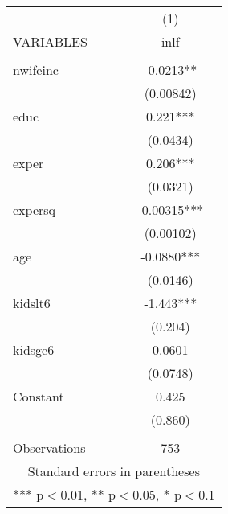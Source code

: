 \documentclass[]{article}
\begin{document}
\begin{tabular}{lc} \hline
 & (1) \\
VARIABLES & inlf \\ \hline
 &  \\
nwifeinc & -0.0213** \\
 & (0.00842) \\
educ & 0.221*** \\
 & (0.0434) \\
exper & 0.206*** \\
 & (0.0321) \\
expersq & -0.00315*** \\
 & (0.00102) \\
age & -0.0880*** \\
 & (0.0146) \\
kidslt6 & -1.443*** \\
 & (0.204) \\
kidsge6 & 0.0601 \\
 & (0.0748) \\
Constant & 0.425 \\
 & (0.860) \\
 &  \\
 Observations & 753 \\ \hline
\multicolumn{2}{c}{ Standard errors in parentheses} \\
\multicolumn{2}{c}{ *** p$<$0.01, ** p$<$0.05, * p$<$0.1} \\
\end{tabular}
\end{document}

